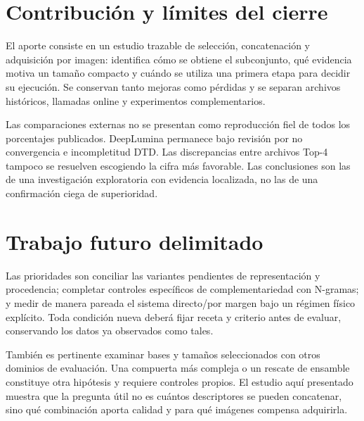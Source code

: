 \section{Contribución y límites del cierre}
El aporte consiste en un estudio trazable de selección, concatenación y adquisición por imagen: identifica cómo se obtiene el subconjunto, qué evidencia motiva un tamaño compacto y cuándo se utiliza una primera etapa para decidir su ejecución. Se conservan tanto mejoras como pérdidas y se separan archivos históricos, llamadas online y experimentos complementarios.

Las comparaciones externas no se presentan como reproducción fiel de todos los porcentajes publicados. DeepLumina permanece bajo revisión por no convergencia e incompletitud DTD. Las discrepancias entre archivos Top-4 tampoco se resuelven escogiendo la cifra más favorable. Las conclusiones son las de una investigación exploratoria con evidencia localizada, no las de una confirmación ciega de superioridad.

\section{Trabajo futuro delimitado}
Las prioridades son conciliar las variantes pendientes de representación y procedencia; completar controles específicos de complementariedad con N-gramas; y medir de manera pareada el sistema directo/por margen bajo un régimen físico explícito. Toda condición nueva deberá fijar receta y criterio antes de evaluar, conservando los datos ya observados como tales.

También es pertinente examinar bases y tamaños seleccionados con otros dominios de evaluación. Una compuerta más compleja o un rescate de ensamble constituye otra hipótesis y requiere controles propios. El estudio aquí presentado muestra que la pregunta útil no es cuántos descriptores se pueden concatenar, sino qué combinación aporta calidad y para qué imágenes compensa adquirirla.
